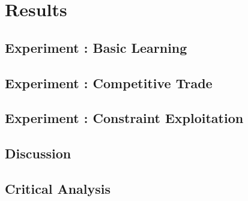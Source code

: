 \chapter{Results}
\label{ch:results}

\section{Experiment : Basic Learning}
\section{Experiment : Competitive Trade}
\section{Experiment : Constraint Exploitation}

\section{Discussion}
\label{sec:discuss}

\section{Critical Analysis}
